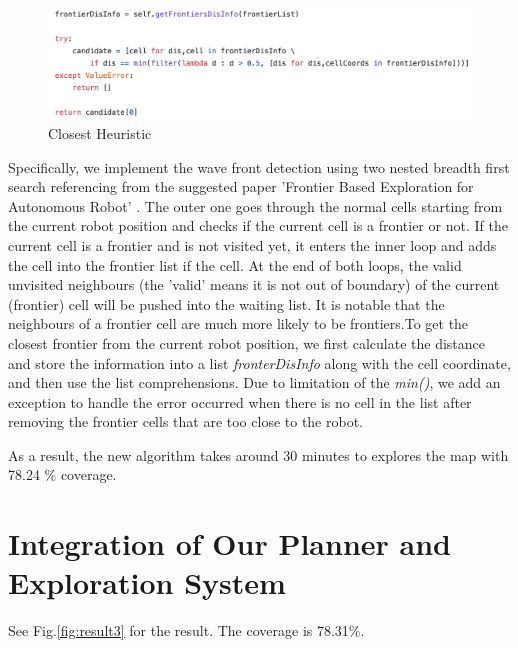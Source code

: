 \documentclass{article}
\begin{document}
\begin{figure}[ht]
\centering
\includegraphics[scale=0.5]{graphs/part2-3/closest.png}
\caption{Closest Heuristic}
\label{fig:closestHeuristic}
\end{figure}

Specifically, we implement the wave front detection using two nested breadth first search referencing from the suggested paper 'Frontier Based Exploration for Autonomous Robot' \cite{WFD}. The outer one goes through the normal cells starting from the current robot position and checks if the current cell is a frontier or not. If the current cell is a frontier and is not visited yet, it enters the inner loop and adds the cell into the frontier list if the cell. At the end of both loops, the valid unvisited neighbours (the 'valid' means it is not out of boundary) of the current (frontier) cell will be pushed into the waiting list. It is notable that the neighbours of a frontier cell are much more likely to be frontiers.To get the closest frontier from the current robot position, we first calculate the distance and store the information into a list \textit{fronterDisInfo} along with the cell coordinate, and then use the list comprehensions. Due to limitation of the \textit{min()}, we add an exception to handle the error occurred when there is no cell in the list after removing the frontier cells that are too close to the robot. 

As a result, the new algorithm takes around 30 minutes to explores the map with 78.24 \% coverage. 

\section{Integration of Our Planner and Exploration System}

See Fig.\ref{fig:result3} for the result. The coverage is  78.31\%.
\end{document}

